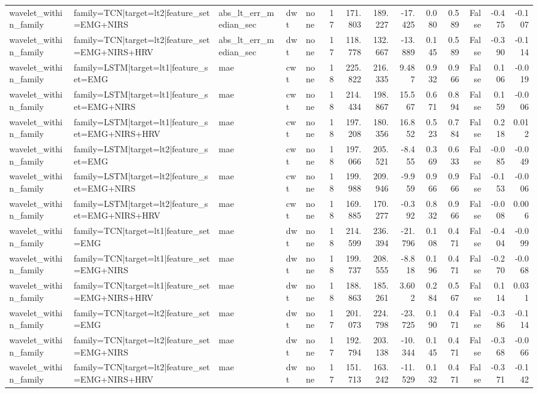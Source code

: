 \begin{table}
\begin{tabular}{lllllrrrrrrrrr}
wavelet_within_family & family=TCN|target=lt2|feature_set=EMG+NIRS & abs_lt_err_median_sec & dwt & none & 17 & 171.803 & 189.227 & -17.425 & 0.080 & 0.589 & False & -0.475 & -0.107 \\
wavelet_within_family & family=TCN|target=lt2|feature_set=EMG+NIRS+HRV & abs_lt_err_median_sec & dwt & none & 17 & 118.778 & 132.667 & -13.889 & 0.145 & 0.589 & False & -0.390 & -0.114 \\
wavelet_within_family & family=LSTM|target=lt1|feature_set=EMG & mae & cwt & none & 18 & 225.822 & 216.335 & 9.487 & 0.932 & 0.966 & False & 0.106 & -0.019 \\
wavelet_within_family & family=LSTM|target=lt1|feature_set=EMG+NIRS & mae & cwt & none & 18 & 214.434 & 198.867 & 15.567 & 0.671 & 0.894 & False & 0.159 & -0.006 \\
wavelet_within_family & family=LSTM|target=lt1|feature_set=EMG+NIRS+HRV & mae & cwt & none & 18 & 197.208 & 180.356 & 16.852 & 0.523 & 0.784 & False & 0.218 & 0.012 \\
wavelet_within_family & family=LSTM|target=lt2|feature_set=EMG & mae & cwt & none & 18 & 197.066 & 205.521 & -8.455 & 0.369 & 0.633 & False & -0.085 & -0.049 \\
wavelet_within_family & family=LSTM|target=lt2|feature_set=EMG+NIRS & mae & cwt & none & 18 & 199.988 & 209.946 & -9.959 & 0.966 & 0.966 & False & -0.153 & -0.006 \\
wavelet_within_family & family=LSTM|target=lt2|feature_set=EMG+NIRS+HRV & mae & cwt & none & 18 & 169.885 & 170.277 & -0.392 & 0.832 & 0.966 & False & -0.008 & 0.006 \\
wavelet_within_family & family=TCN|target=lt1|feature_set=EMG & mae & dwt & none & 18 & 214.599 & 236.394 & -21.796 & 0.108 & 0.471 & False & -0.404 & -0.099 \\
wavelet_within_family & family=TCN|target=lt1|feature_set=EMG+NIRS & mae & dwt & none & 18 & 199.737 & 208.555 & -8.818 & 0.196 & 0.471 & False & -0.270 & -0.068 \\
wavelet_within_family & family=TCN|target=lt1|feature_set=EMG+NIRS+HRV & mae & dwt & none & 18 & 188.863 & 185.261 & 3.602 & 0.284 & 0.567 & False & 0.114 & 0.031 \\
wavelet_within_family & family=TCN|target=lt2|feature_set=EMG & mae & dwt & none & 17 & 201.073 & 224.798 & -23.725 & 0.190 & 0.471 & False & -0.386 & -0.114 \\
wavelet_within_family & family=TCN|target=lt2|feature_set=EMG+NIRS & mae & dwt & none & 17 & 192.794 & 203.138 & -10.344 & 0.145 & 0.471 & False & -0.368 & -0.066 \\
wavelet_within_family & family=TCN|target=lt2|feature_set=EMG+NIRS+HRV & mae & dwt & none & 17 & 151.713 & 163.242 & -11.529 & 0.132 & 0.471 & False & -0.371 & -0.142 \\
\bottomrule
\end{tabular}
\end{table}
